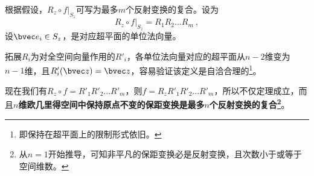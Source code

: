 根据假设，$R_z\circ f|_{S_z}$可写为最多$m$个反射变换的复合。设为
\begin{equation}
R_z\circ f|_{S_z}=R_1R_2...R_{m}~,
\end{equation}
设$\bvec e_i\in S_z$，是对应超平面的单位法向量。

拓展$R_i$为对全空间向量作用的$R'_i$，各单位法向量对应的超平面从$n-2$维变为$n-1$维，且$R'_i(\bvec z)=\bvec z$，容易验证该定义是自洽合理的\footnote{即保持在超平面上的限制形式依旧。}。

现在我们有$R_z \circ f=R'_1R'_2...R'_{m}$，则$f=R_zR'_1R'_2...R'_{m}$，所以不仅定理成立，而且\textbf{$n$维欧几里得空间中保持原点不变的保距变换是最多$n$个反射变换的复合\footnote{从$n=1$开始推导，可知非平凡的保距变换必是反射变换，且次数小于或等于空间维数。}}。
